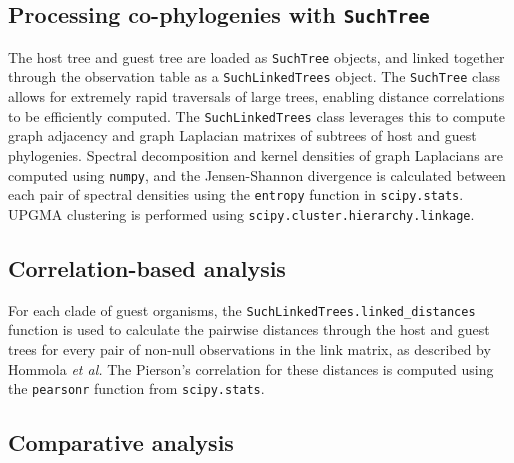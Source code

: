 \subsection{Processing co-phylogenies with {\tt SuchTree}}

The host tree and guest tree are loaded as {\tt SuchTree} objects, and linked together through the observation table as a {\tt SuchLinkedTrees} object. The {\tt SuchTree} class allows for extremely rapid traversals of large trees, enabling distance correlations to be efficiently computed. The {\tt SuchLinkedTrees} class leverages this to compute graph adjacency and graph Laplacian matrixes of subtrees of host and guest phylogenies. Spectral decomposition and kernel densities of graph Laplacians are computed using {\tt numpy}, and the Jensen-Shannon divergence is calculated between each pair of spectral densities using the {\tt entropy} function in {\tt scipy.stats}. UPGMA clustering is performed using {\tt scipy.cluster.hierarchy.linkage}.

\subsection{Correlation-based analysis}

For each clade of guest organisms, the {\tt SuchLinkedTrees.linked_distances} function is used to calculate the pairwise distances through the host and guest trees for every pair of non-null observations in the link matrix, as described by Hommola {\em et al.} \cite{hommola2009permutation} The Pierson's correlation for these distances is computed using the {\tt pearsonr} function from {\tt scipy.stats}.

\subsection{Comparative analysis}

